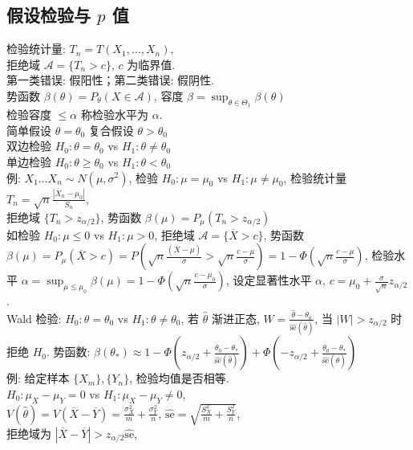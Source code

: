 \documentclass[titlepage, a4paper, landscape]{article}
\begin{document}
\begin{multicols}{4}
\section{假设检验与 $p$ 值}
检验统计量: $T_n = T(X_1, \dots, X_n)$, \\
拒绝域 $\mathcal{A} = \{T_n > c\}$, $c$ 为临界值. \\
第一类错误: 假阳性；第二类错误: 假阴性. \\
势函数 $\beta(\theta) = P_\theta(X\in \mathcal{A})$, 容度 $\beta = \sup_{\theta \in \Theta_1} \beta(\theta)$\\
检验容度 $\leq \alpha$ 称检验水平为 $\alpha$. \\
简单假设 $\theta = \theta_0$ 复合假设 $\theta > \theta_0$ \\
双边检验 $H_0 : \theta = \theta_0$ vs $H_1 : \theta \neq \theta_0$\\
单边检验 $H_0 : \theta \geq \theta_0$ vs $H_1 : \theta < \theta_0$\\
例: $X_1 \dots X_n \sim N(\mu, \sigma^2)$, 检验 $H_0 : \mu = \mu_0$ vs $H_1 : \mu \neq \mu_0$,
检验统计量 $T_n = \sqrt{n} \frac{|\overline X_n - \mu_0|}{S_n}$, \\
拒绝域 $\{T_n > z_{\alpha/2}\}$,
势函数 $\beta(\mu) = P_\mu(T_n > z_{\alpha/2})$\\
如检验 $H_0: \mu \leq 0$ vs $H_1: \mu > 0$,
拒绝域 $\mathcal{A} = \{\overline X > c\}$,
势函数 $\beta(\mu) = P_\mu(\overline X > c) = P(\sqrt{n}\frac {(\overline X - \mu)} {\sigma} > \sqrt{n} \frac {c - \mu} {\sigma}) = 1 - \Phi(\sqrt{n} \frac {c - \mu} {\sigma})$,
检验水平 $\alpha = \sup_{\mu \leq \mu_0} \beta(\mu) = 1 - \Phi(\sqrt{n} \frac {c - \mu_0} {\sigma})$,
设定显著性水平 $\alpha$, $c=\mu_0 + \frac{\sigma}{\sqrt{n}} z_{\alpha / 2}$. \\
Wald 检验: $H_0: \theta = \theta_0$ vs $H_1: \theta \neq \theta_0$,
若 $\hat \theta$ 渐进正态, $W = \frac{\hat \theta - \theta_0}{\hat {\mathrm{se}}(\hat \theta)}$, 当 $|W| > z_{\alpha / 2}$ 时拒绝 $H_0$. 势函数: $\beta(\theta_*)\approx
1 - \Phi(z_{\alpha / 2} + \frac{\theta_0 - \theta_*}{\hat {\mathrm{se}}(\hat \theta)})
+\Phi(-z_{\alpha / 2} + \frac{\theta_0 - \theta_*}{\hat {\mathrm{se}}(\hat \theta)})$\\
例: 给定样本 $\{X_m\}, \{Y_n\}$, 检验均值是否相等. \\
$H_0: \mu_X - \mu_Y = 0$ vs $H_1: \mu_X - \mu_Y \neq 0$, \\
$V(\hat \theta) = V(\overline X - \overline Y) = \frac{\sigma_X^2}{m} + \frac{\sigma_Y^2}{n}$, 
$\hat {\mathrm{se}} = \sqrt{\frac{S_X^2}{m} + \frac{S_Y^2}{n}}$, \\
拒绝域为
$|\overline X - \overline Y| > z_{\alpha / 2} \hat {\mathrm{se}}$, \\


\end{multicols}
\end{document}
